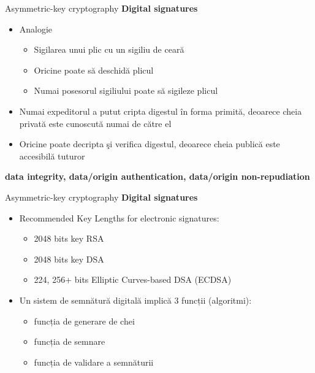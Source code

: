 \documentclass[pdf]{beamer}
\begin{document}
\begin{frame}{Asymmetric-key cryptography}
\textbf{Digital signatures}
\begin{itemize}
\item
Analogie
\begin{itemize}
\item
Sigilarea unui plic cu un sigiliu de ceară
\item
Oricine poate să deschidă plicul
\item
Numai posesorul sigiliului poate să sigileze plicul
\end{itemize}

\item
Numai expeditorul a putut cripta digestul în forma primită, deoarece cheia privată este cunoscută numai de către el

\item
Oricine poate decripta şi verifica digestul, deoarece cheia publică este accesibilă tuturor
\end{itemize}
\textbf{data integrity, data/origin authentication, data/origin non-repudiation}
\end{frame}



\begin{frame}{Asymmetric-key cryptography}
\textbf{Digital signatures}
\begin{itemize}
\item
Recommended  Key Lengths for electronic signatures:
\begin{itemize}
\item
2048 bits key RSA
\item
2048 bits key DSA
\item
224, 256+ bits Elliptic Curves-based DSA (ECDSA)
\end{itemize}

\item
Un sistem de semnătură digitală implică 3 funcții (algoritmi):
\begin{itemize}
\item
funcția de generare de chei
\item
funcția de semnare
\item
funcția de validare a semnăturii

\end{itemize}
\end{itemize}
\end{frame}
\end{document}
